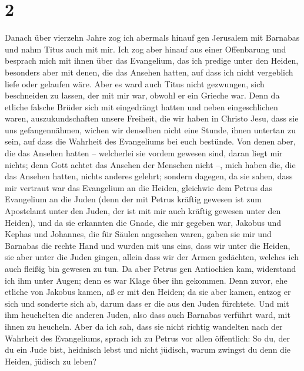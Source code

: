 \hypertarget{section-1}{%
\section{2}\label{section-1}}

 Danach über vierzehn Jahre zog ich abermals hinauf gen
Jerusalem mit Barnabas und nahm Titus auch mit mir.  Ich
zog aber hinauf aus einer Offenbarung und besprach mich mit ihnen über
das Evangelium, das ich predige unter den Heiden, besonders aber mit
denen, die das Ansehen hatten, auf dass ich nicht vergeblich liefe oder
gelaufen wäre.  Aber es ward auch Titus nicht gezwungen,
sich beschneiden zu lassen, der mit mir war, obwohl er ein Grieche war.
 Denn da etliche falsche Brüder sich mit eingedrängt
hatten und neben eingeschlichen waren, auszukundschaften unsere
Freiheit, die wir haben in Christo Jesu, dass sie uns gefangennähmen,
 wichen wir denselben nicht eine Stunde, ihnen untertan zu
sein, auf dass die Wahrheit des Evangeliums bei euch bestünde.
 Von denen aber, die das Ansehen hatten -- welcherlei sie
vordem gewesen sind, daran liegt mir nichts; denn Gott achtet das
Ansehen der Menschen nicht --, mich haben die, die das Ansehen hatten,
nichts anderes gelehrt;  sondern dagegen, da sie sahen,
dass mir vertraut war das Evangelium an die Heiden, gleichwie dem Petrus
das Evangelium an die Juden  (denn der mit Petrus kräftig
gewesen ist zum Apostelamt unter den Juden, der ist mit mir auch kräftig
gewesen unter den Heiden),  und da sie erkannten die
Gnade, die mir gegeben war, Jakobus und Kephas und Johannes, die für
Säulen angesehen waren, gaben sie mir und Barnabas die rechte Hand und
wurden mit uns eins, dass wir unter die Heiden, sie aber unter die Juden
gingen,  allein dass wir der Armen gedächten, welches ich
auch fleißig bin gewesen zu tun.  Da aber Petrus gen
Antiochien kam, widerstand ich ihm unter Augen; denn es war Klage über
ihn gekommen.  Denn zuvor, ehe etliche von Jakobus kamen,
aß er mit den Heiden; da sie aber kamen, entzog er sich und sonderte
sich ab, darum dass er die aus den Juden fürchtete.  Und
mit ihm heuchelten die anderen Juden, also dass auch Barnabas verführt
ward, mit ihnen zu heucheln.  Aber da ich sah, dass sie
nicht richtig wandelten nach der Wahrheit des Evangeliums, sprach ich zu
Petrus vor allen öffentlich: So du, der du ein Jude bist, heidnisch
lebst und nicht jüdisch, warum zwingst du denn die Heiden, jüdisch zu
leben?

